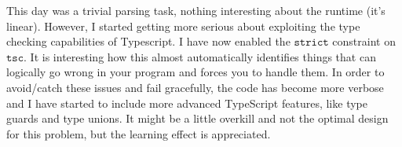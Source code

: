 This day was a trivial parsing task, nothing interesting about the runtime (it's linear). However, I started getting more serious about exploiting the type checking capabilities of Typescript. I have now enabled the $\texttt{strict}$ constraint on $\texttt{tsc}$. It is interesting how this almost automatically identifies things that can logically go wrong in your program and forces you to handle them. In order to avoid/catch these issues and fail gracefully, the code has become more verbose and I have started to include more advanced TypeScript features, like type guards and type unions. It might be a little overkill and not the optimal design for this problem, but the learning effect is appreciated.